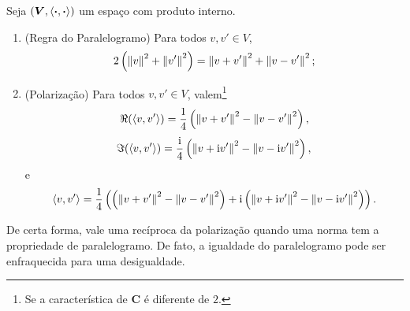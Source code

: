 \begin{proposition}
Seja $(\bm V,\left\langle{\bm{\cdot}},{\bm{\cdot}}\right\rangle)$ um espaço com produto interno.
	\begin{enumerate}
	\item (Regra do Paralelogramo) Para todos $v,v' \in V$,
		\begin{equation*}
			2\left( \left\Vert{v}\right\Vert^2 + \left\Vert{v'}\right\Vert^2 \right) = \left\Vert{v+v'}\right\Vert^2+\left\Vert{v-v'}\right\Vert^2;
		\end{equation*}

	\item (Polarização) Para todos $v,v' \in V$, valem\footnote{Se a característica de $\bm C$ é diferente de $2$.}
		\begin{equation*}
		\Re(\left\langle{v},{v'}\right\rangle) = \frac{1}{4}\left(\left\Vert{v+v'}\right\Vert^2 - \left\Vert{v-v'}\right\Vert^2\right),
		\end{equation*}
		\begin{equation*}
		\Im(\left\langle{v},{v'}\right\rangle) = \frac{\mathrm{i}}{4}\left(\left\Vert{v+\mathrm{i}v'}\right\Vert^2 - \left\Vert{v-\mathrm{i}v'}\right\Vert^2\right),
		\end{equation*}
e
		\begin{equation*}
		\left\langle{v},{v'}\right\rangle = \frac{1}{4} \left( \left(\left\Vert{v+v'}\right\Vert^2 - \left\Vert{v-v'}\right\Vert^2\right) + \mathrm{i} \left(\left\Vert{v+\mathrm{i}v'}\right\Vert^2 - \left\Vert{v-\mathrm{i}v'}\right\Vert^2\right) \right).
		\end{equation*}
	\end{enumerate}
\end{proposition}

De certa forma, vale uma recíproca da polarização quando uma norma tem a propriedade de paralelogramo. De fato, a igualdade do paralelogramo pode ser enfraquecida para uma desigualdade.

